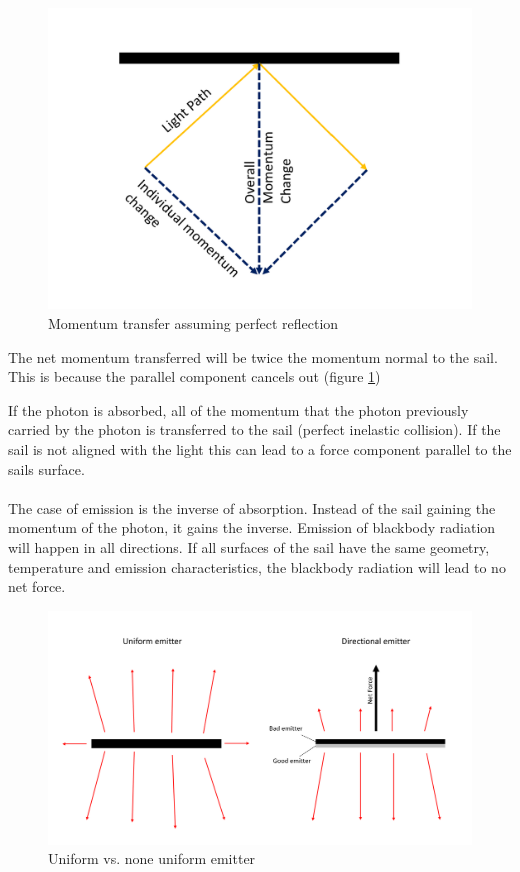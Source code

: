 \documentclass[14pt]{article}
\begin{document}
\begin{figure}[H]
  \includegraphics[width=14cm]{./resources/solar_sail_momentum.png}
  \caption{Momentum transfer assuming perfect reflection}
  \label{fig:sail_momentum_reflected}
\end{figure}

The net momentum transferred will be twice the momentum normal to the sail.
This is because the parallel component cancels out (figure \ref{fig:sail_momentum_reflected})

If the photon is absorbed, all of the momentum that the photon previously carried by the photon is transferred to
the sail (perfect inelastic collision). If the sail is not aligned with the light this can lead to a force component
parallel to the sails surface.\\
\\
The case of emission is the inverse of absorption. Instead of the sail gaining the momentum of the photon, it gains the inverse. 
Emission of blackbody radiation will happen in all directions. If all surfaces of the sail have the same geometry,
temperature and emission characteristics, the blackbody radiation will lead to no net force.

\begin{figure}[H]
  \includegraphics[width=14cm]{./resources/dicrectional_emitter.png}
  \caption{Uniform vs. none uniform emitter}
  \label{fig:dicrectional_emitter}
\end{figure}
\end{document}

